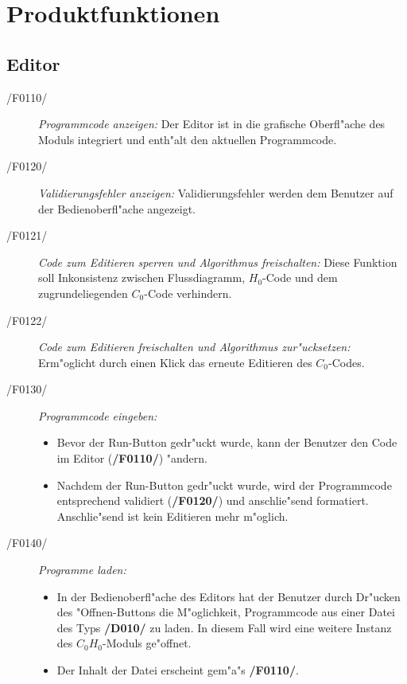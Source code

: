 \section{Produktfunktionen}


\subsection{Editor}
  \begin{description}
    \item[/F0110/]
      \textit{Programmcode anzeigen:} Der Editor ist in die grafische
      Oberfl"ache des Moduls integriert und enth"alt den aktuellen
      Programmcode.

    \item[/F0120/]
      \textit{Validierungsfehler anzeigen:} Validierungsfehler werden dem
      Benutzer auf der Bedienoberfl"ache angezeigt.

    \item[/F0121/]
      \textit{Code zum Editieren sperren und Algorithmus freischalten:}
      Diese Funktion soll Inkonsistenz zwischen Flussdiagramm, $H_0$-Code und
      dem zugrundeliegenden $C_0$-Code verhindern.

    \item[/F0122/]
      \textit{Code zum Editieren freischalten und Algorithmus zur"ucksetzen:}
      Erm"oglicht durch einen Klick das erneute Editieren des $C_0$-Codes.

    \item[/F0130/]
      \textit{Programmcode eingeben:}
      \begin{itemize}
        \item Bevor der Run-Button gedr"uckt wurde, kann der Benutzer den Code
        im Editor (\textbf{/F0110/}) "andern.
        \item Nachdem der Run-Button gedr"uckt wurde, wird der Programmcode
        entsprechend validiert (\textbf{/F0120/}) und anschlie"send formatiert.
        Anschlie"send ist kein Editieren mehr m"oglich.
      \end{itemize}

    \item[/F0140/]
      \textit{Programme laden:}
      \begin{itemize}
        \item In der Bedienoberfl"ache des Editors hat der Benutzer durch Dr"ucken des
        "Offnen-Buttons die M"oglichkeit, Programmcode aus einer Datei des Typs
        \textbf{/D010/} zu laden.
        In diesem Fall wird eine weitere Instanz des $C_0$$H_0$-Moduls ge"offnet.
				\item Der Inhalt der Datei erscheint gem"a"s \textbf{/F0110/}.
      \end{itemize}
    

\end{description}
